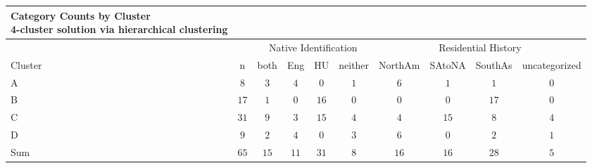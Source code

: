 \captionsetup[table]{labelformat=empty,skip=1pt}
\begin{longtable}{lccccccccc}
\caption*{
{\large Category Counts by Cluster} \\ 
{\small 4-cluster solution via hierarchical clustering}
} \\ 
\toprule
 &  & \multicolumn{4}{c}{Native Identification} & \multicolumn{4}{c}{Residential History} \\ 
 \cmidrule(lr){3-6} \cmidrule(lr){7-10}
Cluster & n & both & Eng & HU & neither & NorthAm & SAtoNA & SouthAs & uncategorized \\ 
\midrule
A & $8$ & $3$ & $4$ & $0$ & $1$ & $6$ & $1$ & $1$ & $0$ \\ 
B & $17$ & $1$ & $0$ & $16$ & $0$ & $0$ & $0$ & $17$ & $0$ \\ 
C & $31$ & $9$ & $3$ & $15$ & $4$ & $4$ & $15$ & $8$ & $4$ \\ 
D & $9$ & $2$ & $4$ & $0$ & $3$ & $6$ & $0$ & $2$ & $1$ \\ 
 \midrule 
\midrule 
Sum & $65$ & $15$ & $11$ & $31$ & $8$ & $16$ & $16$ & $28$ & $5$ \\ 
\bottomrule
\end{longtable}

